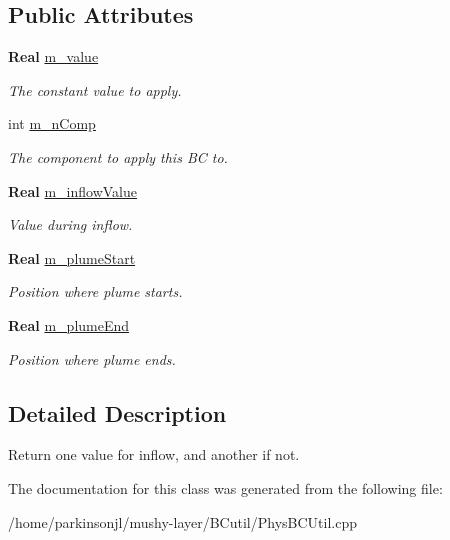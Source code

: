 \subsection*{Public Attributes}
\begin{DoxyCompactItemize}
\item 
\mbox{\label{class_inflow_value_function_a5a02392c298428969a7d750bbb111e80}} 
\textbf{ Real} \hyperlink{class_inflow_value_function_a5a02392c298428969a7d750bbb111e80}{m\+\_\+value}
\begin{DoxyCompactList}\small\item\em The constant value to apply. \end{DoxyCompactList}\item 
\mbox{\label{class_inflow_value_function_a5d9645cce1fdb3972fc7e2ae2b644b98}} 
int \hyperlink{class_inflow_value_function_a5d9645cce1fdb3972fc7e2ae2b644b98}{m\+\_\+n\+Comp}
\begin{DoxyCompactList}\small\item\em The component to apply this BC to. \end{DoxyCompactList}\item 
\mbox{\label{class_inflow_value_function_a46bcf5848d66c489ac517d55259bfe44}} 
\textbf{ Real} \hyperlink{class_inflow_value_function_a46bcf5848d66c489ac517d55259bfe44}{m\+\_\+inflow\+Value}
\begin{DoxyCompactList}\small\item\em Value during inflow. \end{DoxyCompactList}\item 
\mbox{\label{class_inflow_value_function_a3e3686426aac78ec5aed2098e87f744c}} 
\textbf{ Real} \hyperlink{class_inflow_value_function_a3e3686426aac78ec5aed2098e87f744c}{m\+\_\+plume\+Start}
\begin{DoxyCompactList}\small\item\em Position where plume starts. \end{DoxyCompactList}\item 
\mbox{\label{class_inflow_value_function_aa8f3be53977376cea300461c24e67e00}} 
\textbf{ Real} \hyperlink{class_inflow_value_function_aa8f3be53977376cea300461c24e67e00}{m\+\_\+plume\+End}
\begin{DoxyCompactList}\small\item\em Position where plume ends. \end{DoxyCompactList}\end{DoxyCompactItemize}


\subsection{Detailed Description}
Return one value for inflow, and another if not. 

The documentation for this class was generated from the following file\+:\begin{DoxyCompactItemize}
\item 
/home/parkinsonjl/mushy-\/layer/\+B\+Cutil/Phys\+B\+C\+Util.\+cpp\end{DoxyCompactItemize}
